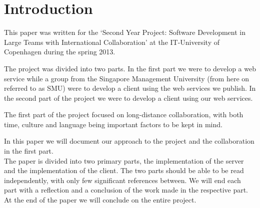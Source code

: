 \section{Introduction}
This paper was written for the `Second Year Project: Software Development in Large Teams with International Collaboration' at the IT-University of Copenhagen during the spring 2013.

The project was divided into two parts. In the first part we were to develop a web service while a group from the Singapore Management University (from here on referred to as SMU) were to develop a client using the web services we publish. In the second part of the project we were to develop a client using our web services.

The first part of the project focused on long-distance collaboration, with both time, culture and language being important factors to be kept in mind.

In this paper we will document our approach to the project and the collaboration in the first part.\\
The paper is divided into two primary parts, the implementation of the server and the implementation of the client.
The two parts should be able to be read independently, with only few significant references between. We will end each part with a reflection and a conclusion of the work made in the respective part.
At the end of the paper we will conclude on the entire project.
\newpage